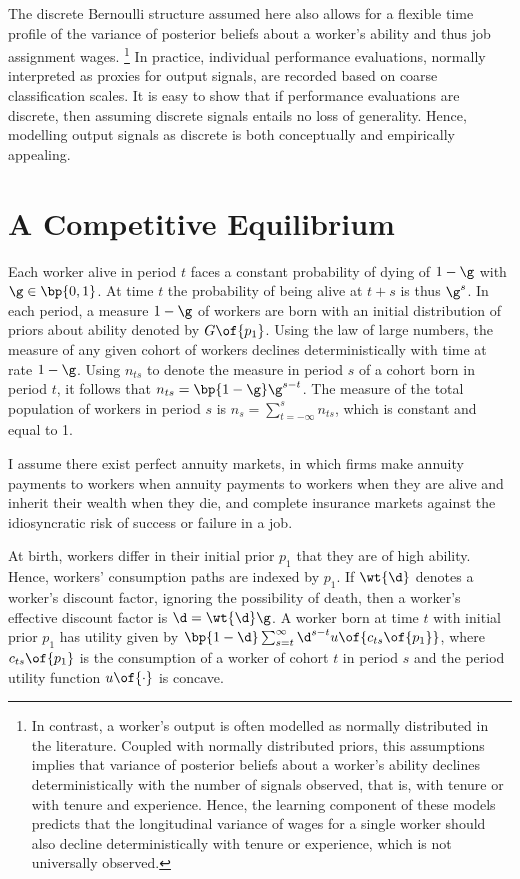 \documentclass[12pt]{article}
\theoremstyle{definition}
\begin{document}
The discrete Bernoulli structure assumed here also allows for a flexible time profile of the variance of posterior beliefs about a worker's ability and thus job assignment wages. \footnote{In contrast, a worker's output is often modelled as normally distributed in the literature. Coupled with normally distributed priors, this assumptions implies that variance of posterior beliefs about a worker's ability declines deterministically with the number of signals observed, that is, with tenure or with tenure and experience. Hence, the learning component of these models predicts that the longitudinal variance of wages for a single worker should also decline deterministically with tenure or experience, which is not universally observed.} In practice, individual performance evaluations, normally interpreted as proxies for output signals, are recorded based on coarse classification scales. It is easy to show that if performance evaluations are discrete, then assuming discrete signals entails no loss of generality. Hence, modelling output signals as discrete is both conceptually and empirically appealing. 

\section{A Competitive Equilibrium}

Each worker alive in period $t$ faces a constant probability of dying of $1 - \g$ with $\g \in \bp{0, 1}$. At time $t$ the probability of being alive at $t+s$ is thus $\g^s$. In each period, a measure $1-\g$ of workers are born with an initial distribution of priors about ability denoted by $G\of{p_1}$. Using the law of large numbers, the measure of any given cohort of workers declines deterministically with time at rate $1-\g$. Using $n_{ts}$ to denote the measure in period $s$ of a cohort born in period $t$, it follows that $n_{ts} = \bp{1-\g}\g^{s-t}$. The measure of the total population of workers in period $s$ is $n_s = \sum_{t=-\infty}^s n_{ts}$, which is constant and equal to 1. 

I assume there exist perfect annuity markets, in which firms make annuity payments to workers when annuity payments to workers when they are alive and inherit their wealth when they die, and complete insurance markets against the idiosyncratic risk of success or failure in a job. 

At birth, workers differ in their initial prior $p_1$ that they are of high ability. Hence, workers' consumption paths are indexed by $p_1$. If $\wt{\d}$ denotes a worker's discount factor, ignoring the possibility of death, then a worker's effective discount factor is $\d = \wt{\d}\g$. A worker born at time $t$ with initial prior $p_1$ has utility given by $\bp{1-\d} \sum_{s=t}^{\infty}\d^{s-t}u\of{c_{ts}\of{p_1}}$, where $c_{ts}\of{p_1}$ is the consumption of a worker of cohort $t$ in period $s$ and the period utility function $u\of{\cdot}$ is concave. 
\end{document}
